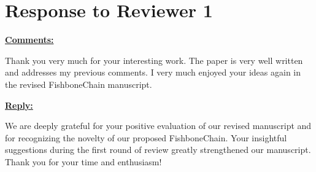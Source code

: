 \section*{Response to Reviewer 1}\label{par:r1}
{\large

\noindent \underline{\textbf{Comments:}}

Thank you very much for your interesting work. The paper is very well written and addresses my previous comments. I very much enjoyed your ideas again in the revised FishboneChain manuscript.
{\color{blue}
\noindent \underline{\textbf{Reply:}}

We are deeply grateful for your positive evaluation of our revised manuscript and for recognizing the novelty of our proposed FishboneChain. Your insightful suggestions during the first round of review greatly strengthened our manuscript. Thank you for your time and enthusiasm!
}%
}